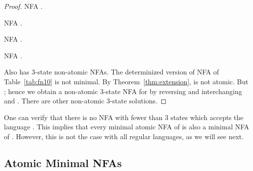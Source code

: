 \documentclass[preprint,12pt]{elsarticle}
\begin{document}
\begin{proof}
\begin{table}[hbt]
\begin{minipage}[b]{0.45\linewidth}
\caption{NFA .}
\label{tab:fn10}
{\footnotesize
\begin{center}

\end{center}}
\end{minipage}
\hspace{0.2cm}
\begin{minipage}[b]{0.45\linewidth}
\caption{NFA .}
\label{tab:fn25}
{\footnotesize
\begin{center}

\end{center}}
\end{minipage}
\end{table}

\begin{table}[h]
\begin{minipage}[b]{0.45\linewidth}
\caption{NFA .}
\label{tab:fn26}
{\footnotesize
\begin{center}

\end{center}}
\end{minipage}
\hspace{0.2cm}
\begin{minipage}[b]{0.45\linewidth}
\caption{NFA .}
\label{tab:fn281}
{\footnotesize
\begin{center}

\end{center}}
\end{minipage}
\end{table}


Also  has 3-state non-atomic NFAs.
The determinized version of NFA  of Table~\ref{tab:fn10} is not minimal.
By Theorem~\ref{thm:extension},  is not atomic. But ;
hence we obtain a non-atomic 3-state NFA for  by reversing  and interchanging  and . There are other non-atomic 3-state solutions.
\end{proof}

One can verify that there is no NFA with fewer than 3 states which
accepts the language .
This implies that every minimal atomic NFA of  is also 
a minimal NFA of .
However, this is not the case with all regular languages, as we will see next. 



\subsection{Atomic Minimal NFAs}
 
\end{document}
